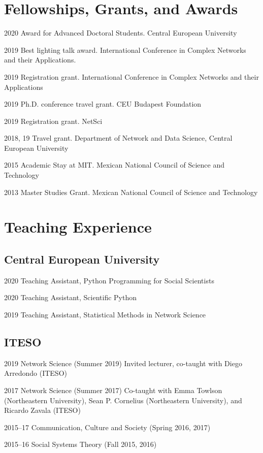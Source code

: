 \documentclass{academiccv}
\begin{document}
\section*{Fellowships, Grants, and Awards}
\begin{tablist}
	\item[2020] \tab Award for Advanced Doctoral Students. Central European University 
	\item[2019] \tab Best lighting talk award. International Conference in Complex Networks and their Applications.
	\item[2019] \tab Registration grant. International Conference in Complex Networks and their Applications
	\item[2019] \tab Ph.D. conference travel grant. CEU Budapest Foundation
	\item[2019] \tab Registration grant. NetSci 
	\item[2018, 19] \tab Travel grant. Department of Network and Data Science, Central European University
	\item[2015] \tab Academic Stay at MIT. Mexican National Council of Science and Technology
	\item[2013] \tab Master Studies Grant. Mexican National Council of Science and Technology
\end{tablist}

\section*{Teaching Experience}
\subsection*{Central European University}
\begin{tablist}
	\item[2020] \tab Teaching Assistant, Python Programming for Social Scientists
	\item[2020] \tab Teaching Assistant, Scientific Python
	\item[2019] \tab Teaching Assistant, Statistical Methods in Network Science
\end{tablist}

\subsection*{ITESO}
\begin{tablist}
	\item[2019] \tab Network Science (Summer 2019) Invited lecturer, co-taught with Diego Arredondo (ITESO)
	\item[2017]	\tab Network Science (Summer 2017) Co-taught with Emma Towlson (Northeastern University), Sean P. Cornelius (Northeastern University), and Ricardo Zavala (ITESO)
	\item [2015--17]\tab Communication, Culture and Society (Spring 2016, 2017)
	\item [2015--16]\tab Social Systems Theory (Fall 2015, 2016)
\end{tablist} 
\end{document}
